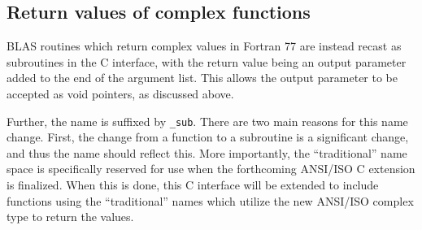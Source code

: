 \documentclass{article}
\begin{document}
\subsection{Return values of complex functions}\label{legacy:c_returncomplex}


BLAS routines which return complex values in Fortran 77 are instead recast as
subroutines in the C interface, with the return value being an output parameter
added to the end of the argument list.  This allows the output parameter to
be accepted as void pointers, as discussed above.

Further, the name is suffixed by {\tt \_sub}.  There are two main reasons
for this name change.  First, the change from a function to a subroutine
is a significant change, and thus the name should reflect this.  More
importantly, the ``traditional'' name space is specifically reserved
for use when the forthcoming ANSI/ISO C extension is finalized.  When
this is done, this C interface will be extended to include functions using
the ``traditional'' names which utilize the new ANSI/ISO complex type to
return the values.
\end{document}
